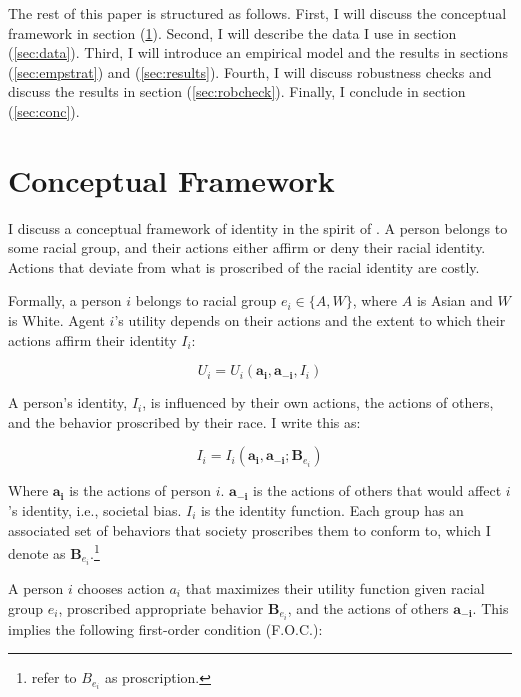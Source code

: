 The rest of this paper is structured as follows. First, I will discuss the conceptual framework in section (\ref{sec:model}). Second, I will describe the data I use in section (\ref{sec:data}). Third, I will introduce an empirical model and the results in sections (\ref{sec:empstrat}) and (\ref{sec:results}). Fourth, I will discuss robustness checks and discuss the results in section (\ref{sec:robcheck}). Finally, I conclude in section (\ref{sec:conc}). 

\section{Conceptual Framework}\label{sec:model}

I discuss a conceptual framework of identity in the spirit of \textcite{akerlofEconomicsIdentity2000}. A person belongs to some racial group, and their actions either affirm or deny their racial identity. Actions that deviate from what is proscribed of the racial identity are costly. 

Formally, a person $i$ belongs to racial group $e_i \in \{A, W\}$, where $A$ is Asian and $W$ is White. Agent $i$'s utility depends on their actions and the extent to which their actions affirm their identity $I_i$:

\begin{equation}
U_i = U_i(\pmb{a_i}, \pmb{a_{-i}}, I_i)\label{eq:util}
\end{equation}

A person's identity, $I_i$, is influenced by their own actions, the actions of others, and the behavior proscribed by their race. I write this as:

\begin{equation}
I_i = I_i(\pmb{a_i}, \pmb{a_{-i}}; \pmb{B}_{e_{i}})\label{eq:identity}
\end{equation}

Where $\pmb{a_i}$ is the actions of person $i$. $\pmb{a_{-i}}$ is the actions of others that would affect $i$'s identity, i.e., societal bias. $I_i$ is the identity function. Each group has an associated set of behaviors that society proscribes them to conform to, which I denote as $\pmb{B}_{e_{i}}$.\footnote{\textcite{akerlofEconomicsIdentity2000} refer to $B_{e_{i}}$ as proscription.}

A person $i$ chooses action $a_i$ that maximizes their utility function given racial group $e_i$, proscribed appropriate behavior $\pmb{B}_{e_{i}}$, and the actions of others $\pmb{a_{-i}}$. This implies the following first-order condition (F.O.C.):

